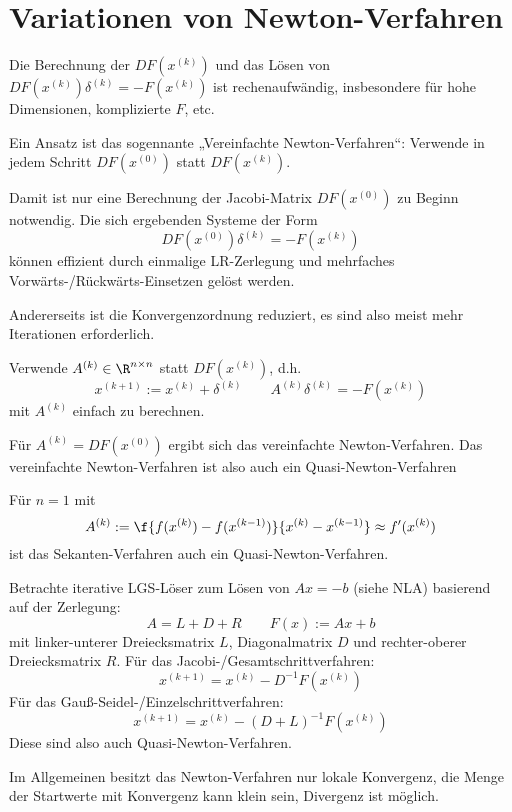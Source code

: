 \documentclass[11pt]{scrbook}
\begin{document}
\section{Variationen von Newton-Verfahren}

Die Berechnung der $DF(x^{(k)})$ und das Lösen von $DF(x^{(k)}) \delta^{(k)} = -F(x^{(k)})$ ist rechenaufwändig, insbesondere für hohe Dimensionen, komplizierte $F$, etc.

\begin{seg}
	Ein Ansatz ist das sogennante „Vereinfachte Newton-Verfahren“:
	Verwende in jedem Schritt $DF(x^{(0)})$ statt $DF(x^{(k)})$.

	Damit ist nur eine Berechnung der Jacobi-Matrix $DF(x^{(0)})$ zu Beginn notwendig.
	Die sich ergebenden Systeme der Form 
	\[
		DF(x^{(0)}) \delta^{(k)} = -F(x^{(k)})
	\]
	können effizient durch einmalige LR-Zerlegung und mehrfaches Vorwärts-/Rückwärts-Einsetzen gelöst werden.

	Andererseits ist die Konvergenzordnung reduziert, es sind also meist mehr Iterationen erforderlich.
\end{seg}

\begin{seg}
	Verwende $A^{(k)} \in \R^{n\times n}$ statt $DF(x^{(k)})$, d.h.
	\[
		x^{(k+1)} := x^{(k)} + \delta^{(k)}
		\qquad A^{(k)} \delta^{(k)}= -F(x^{(k)})
	\]
	mit $A^{(k)}$ einfach zu berechnen.

	Für $A^{(k)} = DF(x^{(0)})$ ergibt sich das vereinfachte Newton-Verfahren.
	Das vereinfachte Newton-Verfahren ist also auch ein Quasi-Newton-Verfahren

	Für $n=1$ mit
	\[
		A^{(k)} := \f {f(x^{(k)}) - f(x^{(k-1)})}{x^{(k)} - x^{(k-1)}} \approx f'(x^{(k)})
	\]
	 ist das Sekanten-Verfahren auch ein Quasi-Newton-Verfahren.

	Betrachte iterative LGS-Löser zum Lösen von $Ax=-b$ (siehe NLA) basierend auf der Zerlegung:
	\[
		A = L + D + R 
		\qquad F(x) := Ax + b
	\]
	mit linker-unterer Dreiecksmatrix $L$, Diagonalmatrix $D$ und rechter-oberer Dreiecksmatrix $R$.
	Für das Jacobi-/Gesamtschrittverfahren:
	\[
		x^{(k+1)} = x^{(k)} - D^{-1} F(x^{(k)})
	\]
	Für das Gauß-Seidel-/Einzelschrittverfahren:
	\[
		x^{(k+1)} = x^{(k)} - (D+L)^{-1} F(x^{(k)})
	\]
	Diese sind also auch Quasi-Newton-Verfahren.
\end{seg}

Im Allgemeinen besitzt das Newton-Verfahren nur lokale Konvergenz, die Menge der Startwerte mit Konvergenz kann klein sein, Divergenz ist möglich.
\end{document}
